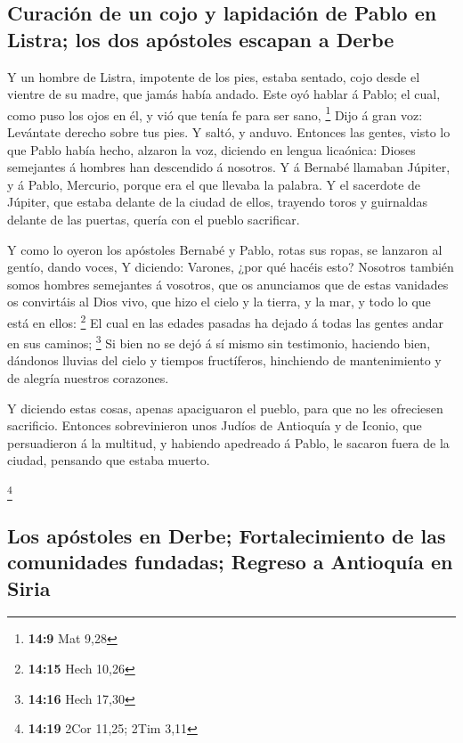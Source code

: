 \hypertarget{curaciuxf3n-de-un-cojo-y-lapidaciuxf3n-de-pablo-en-listra-los-dos-apuxf3stoles-escapan-a-derbe}{%
\subsection{Curación de un cojo y lapidación de Pablo en Listra; los dos
apóstoles escapan a
Derbe}\label{curaciuxf3n-de-un-cojo-y-lapidaciuxf3n-de-pablo-en-listra-los-dos-apuxf3stoles-escapan-a-derbe}}

 Y un hombre de Listra, impotente de los pies, estaba
sentado, cojo desde el vientre de su madre, que jamás había andado.
 Este oyó hablar á Pablo; el cual, como puso los ojos en él,
y vió que tenía fe para ser sano, \footnote{\textbf{14:9} Mat 9,28}
 Dijo á gran voz: Levántate derecho sobre tus pies. Y
saltó, y anduvo.  Entonces las gentes, visto lo que Pablo
había hecho, alzaron la voz, diciendo en lengua licaónica: Dioses
semejantes á hombres han descendido á nosotros.  Y á
Bernabé llamaban Júpiter, y á Pablo, Mercurio, porque era el que llevaba
la palabra.  Y el sacerdote de Júpiter, que estaba delante
de la ciudad de ellos, trayendo toros y guirnaldas delante de las
puertas, quería con el pueblo sacrificar.

 Y como lo oyeron los apóstoles Bernabé y Pablo, rotas sus
ropas, se lanzaron al gentío, dando voces,  Y diciendo:
Varones, ¿por qué hacéis esto? Nosotros también somos hombres semejantes
á vosotros, que os anunciamos que de estas vanidades os convirtáis al
Dios vivo, que hizo el cielo y la tierra, y la mar, y todo lo que está
en ellos: \footnote{\textbf{14:15} Hech 10,26}  El cual en
las edades pasadas ha dejado á todas las gentes andar en sus caminos;
\footnote{\textbf{14:16} Hech 17,30}  Si bien no se dejó á
sí mismo sin testimonio, haciendo bien, dándonos lluvias del cielo y
tiempos fructíferos, hinchiendo de mantenimiento y de alegría nuestros
corazones.

 Y diciendo estas cosas, apenas apaciguaron el pueblo, para
que no les ofreciesen sacrificio.  Entonces sobrevinieron
unos Judíos de Antioquía y de Iconio, que persuadieron á la multitud, y
habiendo apedreado á Pablo, le sacaron fuera de la ciudad, pensando que
estaba muerto.

\footnote{\textbf{14:19} 2Cor 11,25; 2Tim 3,11}

\hypertarget{los-apuxf3stoles-en-derbe-fortalecimiento-de-las-comunidades-fundadas-regreso-a-antioquuxeda-en-siria}{%
\subsection{Los apóstoles en Derbe; Fortalecimiento de las comunidades
fundadas; Regreso a Antioquía en
Siria}\label{los-apuxf3stoles-en-derbe-fortalecimiento-de-las-comunidades-fundadas-regreso-a-antioquuxeda-en-siria}}

